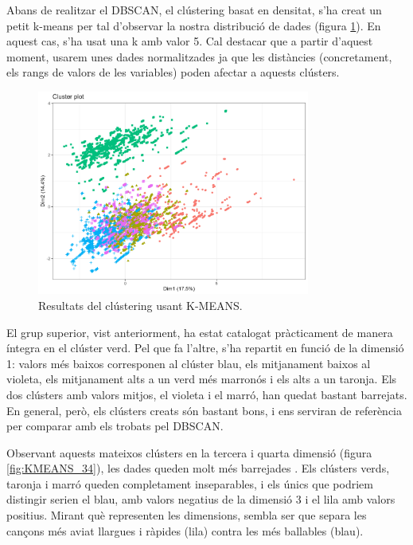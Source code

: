 Abans de realitzar el DBSCAN, el clústering basat en densitat, s’ha creat un petit k-means per tal d’observar la nostra distribució de dades  (figura \ref{fig:KMEANS}). En aquest cas, s’ha usat una k amb valor 5. Cal destacar que a partir d'aquest moment, usarem unes dades normalitzades ja que les distàncies (concretament, els rangs de valors de les variables) poden afectar a aquests clústers.

\begin{figure}[H]
    \centering
    \includegraphics[width=0.8\textwidth]{Images/4_clustering/DBSCAN/kmeans.png}
    \caption{Resultats del clústering usant K-MEANS.}
    \label{fig:KMEANS}
\end{figure}

El grup superior, vist anteriorment, ha estat catalogat pràcticament de manera íntegra en el clúster verd. Pel que fa l’altre, s’ha repartit en funció de la dimensió 1: valors més baixos corresponen al clúster blau, els mitjanament baixos al violeta, els mitjanament alts a un verd més marronós i els alts a un taronja. Els dos clústers amb valors mitjos, el violeta i el marró, han quedat bastant barrejats. En general, però, els clústers creats són bastant bons, i ens serviran de referència per comparar amb els trobats pel DBSCAN.

Observant aquests mateixos clústers en la tercera i quarta dimensió (figura \ref{fig:KMEANS_34}), les dades queden molt més barrejades . Els clústers verds, taronja i marró queden completament inseparables, i els únics que podriem distingir serien el blau, amb valors negatius de la dimensió 3 i el lila amb valors positius. Mirant què representen les dimensions, sembla ser que separa les cançons més aviat llargues i ràpides (lila) contra les més ballables (blau).

